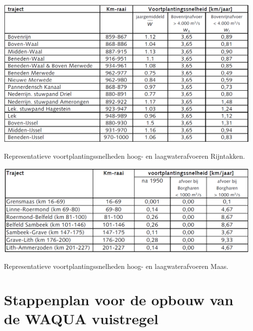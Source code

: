 \begin{table}
\includegraphics[width=\columnwidth]{figures/Tab4_the2nd.png}
\caption{Representatieve voortplantingssnelheden hoog- en laagwaterafvoeren Rijntakken.}
\label{Tab4}
\end{table}

\begin{table}
\includegraphics[width=\columnwidth]{figures/Tab5.png}
\caption{Representatieve voortplantingssnelheden hoog- en laagwaterafvoeren Maas.}
\label{Tab5}
\end{table}

\section{Stappenplan voor de opbouw van de WAQUA vuistregel}

